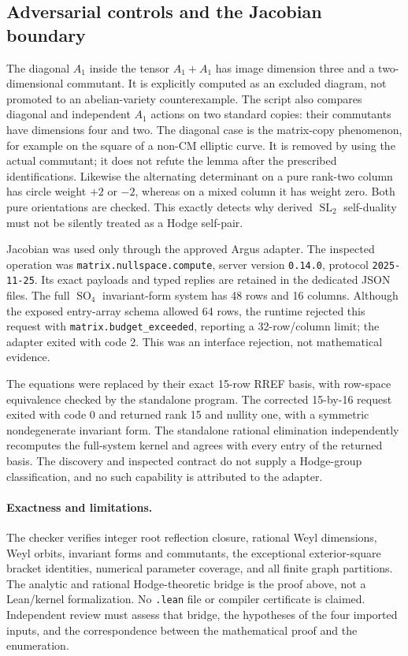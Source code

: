 \documentclass[11pt]{article}
\DeclareMathOperator{\SL}{SL}
\DeclareMathOperator{\SO}{SO}
\theoremstyle{remark}
\begin{document}
\subsection{Adversarial controls and the Jacobian boundary}

The diagonal $A_1$ inside the tensor $A_1+A_1$ has image dimension
three and a two-dimensional commutant. It is explicitly computed
as an excluded diagram, not promoted to an abelian-variety
counterexample. The script also compares diagonal and independent
$A_1$ actions on two standard copies: their commutants have
dimensions four and two. The diagonal case is the matrix-copy
phenomenon, for example on the square of a non-CM elliptic curve.
It is removed by using the actual commutant; it does not refute
the lemma after the prescribed identifications.
Likewise the alternating determinant on a pure rank-two column has
circle weight $+2$ or $-2$, whereas on a mixed column it has weight zero.
Both pure orientations are checked.
This exactly detects why derived $\SL_2$ self-duality must not be
silently treated as a Hodge self-pair.

Jacobian was used only through the approved Argus adapter.
The inspected operation was \texttt{matrix.nullspace.compute},
server version \texttt{0.14.0}, protocol \texttt{2025-11-25}.
Its exact payloads and typed replies are retained in the dedicated
JSON files. The full $\SO_4$ invariant-form system has 48 rows
and 16 columns. Although the exposed entry-array schema allowed
64 rows, the runtime rejected this request with
\texttt{matrix.budget\_exceeded}, reporting a 32-row/column limit;
the adapter exited with code 2. This was an interface rejection,
not mathematical evidence.

The equations were replaced by their exact 15-row RREF basis,
with row-space equivalence checked by the standalone program.
The corrected 15-by-16 request exited with code 0 and returned
rank 15 and nullity one, with a symmetric nondegenerate invariant
form. The standalone rational elimination independently recomputes
the full-system kernel and agrees with every entry of the returned
basis. The discovery and inspected contract do not supply a
Hodge-group classification, and no such capability is attributed
to the adapter.

\paragraph{Exactness and limitations.}
The checker verifies integer root reflection closure, rational
Weyl dimensions, Weyl orbits, invariant forms and commutants,
the exceptional exterior-square bracket identities, numerical
parameter coverage, and all finite graph partitions. The analytic
and rational Hodge-theoretic bridge is the proof above, not a
Lean/kernel formalization. No \texttt{.lean} file or compiler
certificate is claimed. Independent review must assess that bridge,
the hypotheses of the four imported inputs, and the correspondence
between the mathematical proof and the enumeration.
\end{document}
